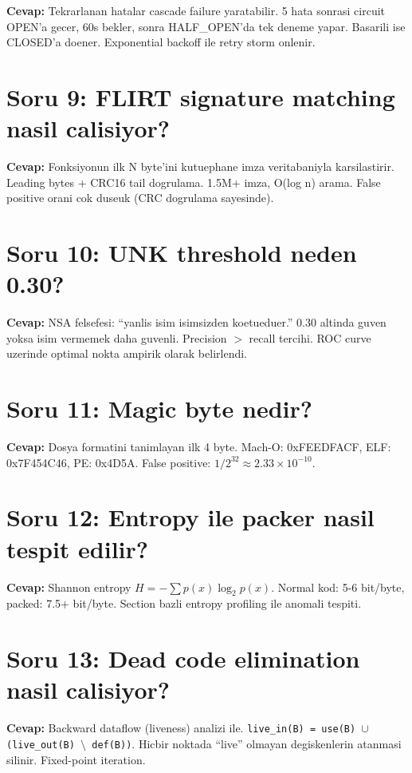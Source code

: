 \documentclass[12pt,a4paper,oneside]{book}
\theoremstyle{definition}
\newcommand{\code}[1]{\texttt{\color{green!60!white}#1}}
\begin{document}
\textbf{Cevap:} Tekrarlanan hatalar cascade failure yaratabilir. 5 hata sonrasi circuit OPEN'a gecer, 60s bekler, sonra HALF\_OPEN'da tek deneme yapar. Basarili ise CLOSED'a doener. Exponential backoff ile retry storm onlenir.

\section{Soru 9: FLIRT signature matching nasil calisiyor?}

\textbf{Cevap:} Fonksiyonun ilk N byte'ini kutuephane imza veritabaniyla karsilastirir. Leading bytes + CRC16 tail dogrulama. 1.5M+ imza, O(log n) arama. False positive orani cok duseuk (CRC dogrulama sayesinde).

\section{Soru 10: UNK threshold neden 0.30?}

\textbf{Cevap:} NSA felsefesi: ``yanlis isim isimsizden koetueduer.'' 0.30 altinda guven yoksa isim vermemek daha guvenli. Precision $>$ recall tercihi. ROC curve uzerinde optimal nokta ampirik olarak belirlendi.

\section{Soru 11: Magic byte nedir?}

\textbf{Cevap:} Dosya formatini tanimlayan ilk 4 byte. Mach-O: 0xFEEDFACF, ELF: 0x7F454C46, PE: 0x4D5A. False positive: $1/2^{32} \approx 2.33 \times 10^{-10}$.

\section{Soru 12: Entropy ile packer nasil tespit edilir?}

\textbf{Cevap:} Shannon entropy $H = -\sum p(x) \log_2 p(x)$. Normal kod: 5-6 bit/byte, packed: 7.5+ bit/byte. Section bazli entropy profiling ile anomali tespiti.

\section{Soru 13: Dead code elimination nasil calisiyor?}

\textbf{Cevap:} Backward dataflow (liveness) analizi ile. \code{live\_in(B) = use(B) $\cup$ (live\_out(B) $\setminus$ def(B))}. Hicbir noktada ``live'' olmayan degiskenlerin atanmasi silinir. Fixed-point iteration.
\end{document}
